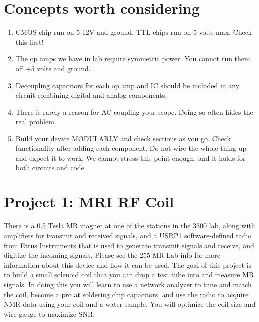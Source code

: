 \documentclass[12pt]{article}
\begin{document}
\section*{Concepts worth considering}
\begin{enumerate}
\item CMOS chip run on 5-12V and ground. TTL chips run on 5 volts max. Check this first!
\item The op amps we have in lab require symmetric power. You cannot run them off +5 volts and
ground.
\item Decoupling capacitors for each op amp and IC should be included in any circuit combining
digital and analog components.
\item There is rarely a reason for AC coupling your scope. Doing so often hides the real problem.
\item Build your device MODULARLY and check sections as you go. 
Check functionality after adding each component. 
Do not wire the whole thing up and expect it to work.
We cannot stress this point enough, and it holds for both circuits and code. 
\end{enumerate}

\newpage 

\section*{Project 1: MRI RF Coil}

There is a 0.5 Tesla MR magnet at one of the stations in the 3300 lab, 
along with amplifiers for transmit and received signals, and a USRP1 
software-defined radio from Ettus Instruments that is used to generate transmit signals and receive,
and digitize the incoming signals. 
Please see the 255 MR Lab info for more information about this device and how it can be used. 
The goal of this project is to build a small solenoid coil that you can drop a test tube into 
and measure MR signals. 
In doing this you will learn to use a network analyzer to tune and match the coil, 
become a pro at soldering chip capacitors,
and use the radio to acquire NMR data using your coil and a water sample. 
You will optimize the coil size and wire gauge to maximize SNR. 

\newpage
\end{document}

